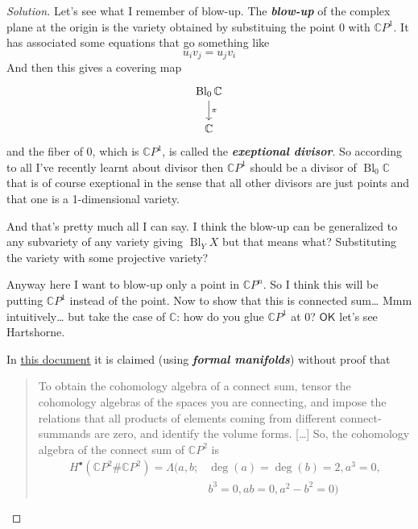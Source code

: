 \begin{proof}[Solution]\leavevmode
	Let's see what I remember of blow-up. The \textit{\textbf{blow-up}} of the complex plane at the origin is the variety obtained by substituing the point 0 with $\mathbb{C}P^{1}$. It has associated some equations that go something like
	\[u_iv_j=u_jv_i\]
	And then this gives a covering map
	\[\begin{tikzcd}
	\operatorname{Bl}_0\mathbb{C}\arrow[d,"\pi"]\\
	\mathbb{C}
	\end{tikzcd}\]
	and the fiber of 0, which is $\mathbb{C}P^{1}$, is called the \textit{\textbf{exeptional divisor}}. So according to all I've recently learnt  about divisor then $\mathbb{C}P^{1}$ should be a divisor of $\operatorname{Bl}_0\mathbb{C}$ that is of course exeptional in the sense that all other divisors are just points and that one is a 1-dimensional variety.

	And that's pretty much all I can say. I think the blow-up can be generalized to any subvariety of any variety giving $\operatorname{Bl}_YX$ but that means what? Substituting the variety with some projective variety?

	Anyway here I want to blow-up only a point in $\mathbb{C}P^{n}$. So I think this will be putting $\mathbb{C}P^{1}$ instead of the point. Now to show that this is connected sum… Mmm intuitively… but take the case of $ \mathbb{C}$: how do you glue $\mathbb{C}P^{1}$ at 0? $\mathsf{OK}$ let's see Hartshorne.
\fi
		\begin{remark}\leavevmode
				In \href{https://www.math.stonybrook.edu/~milivojevic/model2cp2.pdf}{this document} it is claimed (using \textit{\textbf{formal manifolds}}) without proof that
				\begin{quotation}
					To obtain the cohomology algebra of a connect sum, tensor the cohomology algebras of the spaces you are connecting, and impose the relations that all products of elements coming from different connect-summands are zero, and identify the volume forms. […] So, the cohomology algebra of the connect sum of $\mathbb{C}P^{2}$ is
				\begin{align*}H^{\bullet}(\mathbb{C}P^{2}\#\mathbb{C}P^{2})=\Lambda(a,b;&\operatorname{deg}(a)=\operatorname{deg}(b)=2,a^3=0,\\&b^3=0,ab=0,a^2-b^2=0) \end{align*}
				\end{quotation}
				
			\end{remark}


\end{proof}


